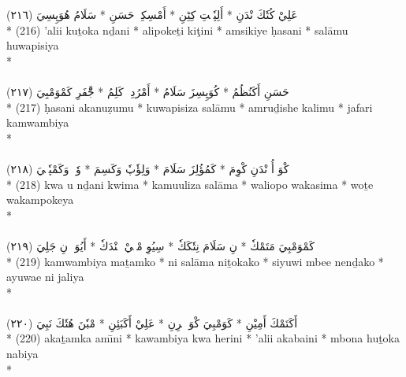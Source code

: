 \documentclass[a4paper, 12pt]{report}
\begin{document}
\begin{center}
\textarabic{(٢١٦) \textcolor{mygreen}{عَلِيْ كُتٗكَ نْدَنِ  * أَلِپٗكٖتِ كِٹِنِ  * أَمْسِكِيٖ حَسَنِ  * سَلَامُ هُوَپِسِيَ }} \\* 
(216) 'alii kuṯoka nḏani  * alipokeṯi kiţini  * amsikiye ḥasani  * salāmu huwapisiya  \\* 
 \\ 
\\[8mm] 

\textarabic{(٢١٧) \textcolor{mygreen}{حَسَنِ أَكَنُظُمُ  * كُوَپِسِزَ سَلَامُ  * أَمْرُدِشٖ كَلِمُ  * جَّْفَرِ كَمْوَمْبِيَ }} \\* 
(217) ḥasani akanuẓumu  * kuwapisiza salāmu  * amruḏishe kalimu  * jaّfari kamwambiya  \\* 
 \\ 
\\[8mm] 

\textarabic{(٢١٨) \textcolor{mygreen}{كْوَ أُ نْدَنِ كْوِمَ  * كَمُؤُلِزَ سَلَامَ  * وَلِؤٗپٗ وَكَسِمَ  * وٗتٖ وَكَمْپٗكٖيَ }} \\* 
(218) kwa u nḏani kwima  * kamuuliza salāma  * waliopo wakasima  * woṯe wakampokeya  \\* 
 \\ 
\\[8mm] 

\textarabic{(٢١٩) \textcolor{mygreen}{كَمْوَمْبِيَ مَتَمْكٗ  * نِ سَلَامَ نِتٗكَكٗ  * سِيُوِ مْبٖيْ نٖنْدَكٗ  * أَيُوَءٖ نِ جَلِيَ }} \\* 
(219) kamwambiya maṯamko  * ni salāma niṯokako  * siyuwi mbee nenḏako  * ayuwae ni jaliya  \\* 
 \\ 
\\[8mm] 

\textarabic{(٢٢٠) \textcolor{mygreen}{أَكَتَمْكَ أَمِيْنِ  * كَوَمْبِيَ كْوَ هٖرِنِ  * عَلِيْ أَكَبَئِنِ  * مْبٗنَ هُتٗكَ نَبِيَ }} \\* 
(220) akaṯamka amı̄ni  * kawambiya kwa herini  * 'alii akabaini  * mbona huṯoka nabiya  \\* 
 \\ 
\\[8mm] 


\end{center}
\end{document}
